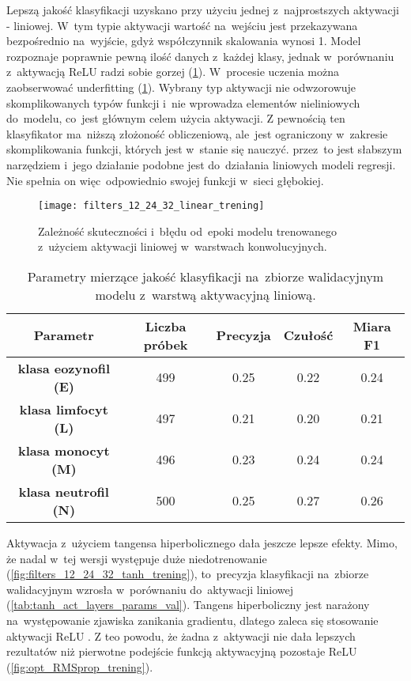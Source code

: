 {Lepszą jakość klasyfikacji uzyskano przy użyciu jednej z~najprostszych aktywacji - liniowej. W~tym typie aktywacji wartość na~wejściu jest przekazywana bezpośrednio na~wyjście, gdyż współczynnik skalowania wynosi 1. Model rozpoznaje poprawnie pewną ilość danych z~każdej klasy, jednak w~porównaniu z~aktywacją ReLU radzi sobie gorzej (\ref{tab:lin_act_layers_params_val}). W~procesie uczenia można zaobserwować underfitting (\ref{fig:filters_12_24_32_linear_trening}). Wybrany typ aktywacji nie odwzorowuje skomplikowanych typów funkcji i~nie wprowadza elementów nieliniowych do~modelu, co~jest głównym celem użycia aktywacji. Z pewnością ten klasyfikator ma~niższą złożoność obliczeniową, ale~jest ograniczony w~zakresie skomplikowania funkcji, których jest w~stanie się nauczyć. przez~to jest słabszym narzędziem i~jego działanie podobne jest do~działania liniowych modeli regresji. Nie spełnia on więc~odpowiednio swojej funkcji w~sieci głębokiej.

\begin{figure}[h!]
	\centering
	\centering
		\texttt{[image: filters\_12\_24\_32\_linear\_trening]}	
	\caption{Zależność skuteczności i~błędu od~epoki modelu trenowanego z~użyciem aktywacji liniowej w~warstwach konwolucyjnych.}\label{fig:filters_12_24_32_linear_trening}
\end{figure}

\begin{table}[h!]
\centering
\caption[Short Heading]{Parametry mierzące jakość klasyfikacji na~zbiorze walidacyjnym modelu z~warstwą aktywacyjną liniową.}
\label{tab:lin_act_layers_params_val}
\begin{tabular}{|c|c|c|c|c|}
\hline
\textbf{Parametr}                               & \textbf{Liczba próbek}  & \textbf{Precyzja} & \textbf{Czułość} & \textbf{Miara F1}\\ \hline
\textbf{klasa eozynofil (E)} & 499  & 0.25   & 0.22   & 0.24  \\ \hline
\textbf{klasa limfocyt (L)}  & 497 & 0.21   & 0.20   & 0.21  \\ \hline
\textbf{klasa monocyt (M)} & 496  & 0.23   & 0.24   & 0.24 \\ \hline
\textbf{klasa neutrofil (N)} & 500 & 0.25   & 0.27    & 0.26  \\ \hline
\end{tabular}
\end{table}

Aktywacja z~użyciem tangensa hiperbolicznego dała jeszcze lepsze efekty. Mimo, że nadal w~tej wersji występuje duże niedotrenowanie (\ref{fig:filters_12_24_32_tanh_trening}), to~precyzja klasyfikacji na~zbiorze walidacyjnym wzrosła w~porównaniu do~aktywacji liniowej (\ref{tab:tanh_act_layers_params_val}). Tangens hiperboliczny jest narażony na~występowanie zjawiska zanikania gradientu, dlatego zaleca się stosowanie aktywacji ReLU \cite{activation_functions}. Z teo powodu, że żadna z~aktywacji nie dała lepszych rezultatów niż pierwotne podejście funkcją aktywacyjną pozostaje ReLU (\ref{fig:opt_RMSprop_trening}).

}
